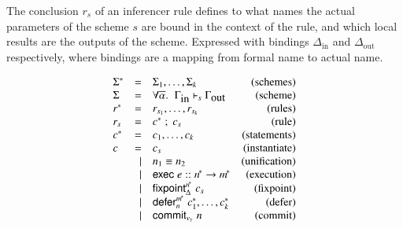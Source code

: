 \documentclass[preprint,natbib]{sigplanconf}
\newcommand\Rule{r}
\newcommand\Rules{\Rule^*}
\newcommand\Statement{c}
\newcommand\Statements{\Statement^*}
\newcommand\Bindings{\Delta}
\newcommand\Env{\Gamma}
\newcommand\Scheme{\Sigma}
\newcommand\Schemes{\Scheme^*}
\newcommand\SchemeName{s}
\newcommand\Type{\tau}
\newcommand\Idents[1]{{#1}^{\!*}}
\newcommand\In{\mbox{in}}
\newcommand\Out{\mbox{out}}
\newcommand\Execution{\mathsf{exec}}
\newcommand\Defer{\mathsf{defer}}
\newcommand\Fixpoint{\mathsf{fixpoint}}
\newcommand\Commit{\mathsf{commit}}
\begin{document}
    The conclusion $\Rule_{\SchemeName}$ of an inferencer rule defines to what names the actual
    parameters of the scheme $\SchemeName$ are bound in the context of the rule, and which
    local results are the outputs of the scheme. Expressed with bindings $\Bindings_{\In}$ and
    $\Bindings_{\Out}$ respectively, where bindings are a mapping from formal name to actual
    name.

    \begin{figure}[htp]
    \begin{displaymath} 
      \begin{array}[t]{lrlr}
        \Schemes                   &    =    &   \Scheme_1, \ldots, \Scheme_k                                                 & (\mbox{schemes})\\
        \Scheme                    &    =    &   \forall \overline{\alpha} .\;\; \Env_{\In} \vdash_{\SchemeName} \Env_{\Out}  & (\mbox{scheme})\\
        \Rules                     &    =    &   \Rule_{\SchemeName_1}, \ldots, \Rule_{\SchemeName_k}                         & (\mbox{rules})\\
        \Rule_\SchemeName          &    =    &   \Statements \; ; \; \Statement_\SchemeName                                   & (\mbox{rule})\\
        \Statements                &    =    &   \Statement_1, \ldots, \Statement_k                                           & (\mbox{statements})\\
        \Statement                 &    =    &   \Statement_{\SchemeName}                                                     & (\mbox{instantiate})\\
                                   &    \mid &    n_1 \equiv n_2                                                              & (\mbox{unification})\\
                                   &    \mid &   \Execution \; e :: \Idents{n} \rightarrow \Idents{m}                         & (\mbox{execution})\\
                                   &    \mid &   \Fixpoint_{\Bindings}^{\Idents{n}} \; \Statement_{\SchemeName}               & (\mbox{fixpoint})\\
                                   &    \mid &   \Defer_n^{\Idents{m}} \; \Statements_1, \ldots, \Statements_k                & (\mbox{defer})\\
                                   &    \mid &   \Commit_{v_{\Type}} \; n                                                     & (\mbox{commit})\\

\end{array}
\end{displaymath}
\end{figure}
\end{document}
